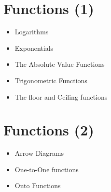 
\newpage
\section{Functions (1)}
\begin{itemize}
\item Logarithms
\item Exponentials
\item The Absolute Value Functions
\item Trigonometric Functions
\item The floor and Ceiling functions
\end{itemize}
\section{Functions (2)}
\begin{itemize}
\item Arrow Diagrams
\item One-to-One functions
\item Onto Functions
\end{itemize}
